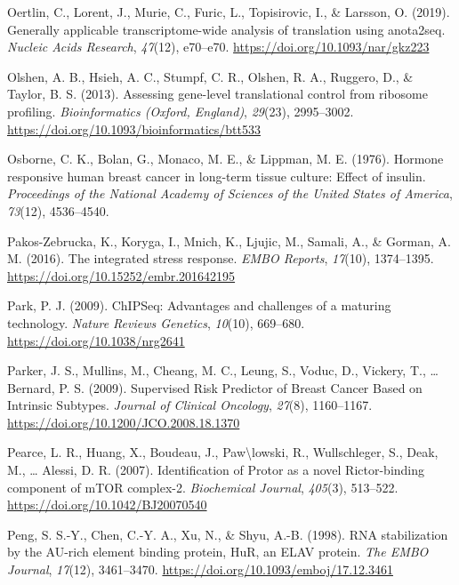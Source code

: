 \documentclass[12pt,openany]{book}
\begin{document}
\hypertarget{ref-Oertlin2019}{}
Oertlin, C., Lorent, J., Murie, C., Furic, L., Topisirovic, I., \&
Larsson, O. (2019). Generally applicable transcriptome-wide analysis of
translation using anota2seq. \emph{Nucleic Acids Research},
\emph{47}(12), e70--e70. \url{https://doi.org/10.1093/nar/gkz223}

\hypertarget{ref-Olshen2013}{}
Olshen, A. B., Hsieh, A. C., Stumpf, C. R., Olshen, R. A., Ruggero, D.,
\& Taylor, B. S. (2013). Assessing gene-level translational control from
ribosome profiling. \emph{Bioinformatics (Oxford, England)},
\emph{29}(23), 2995--3002.
\url{https://doi.org/10.1093/bioinformatics/btt533}

\hypertarget{ref-Osborne1976}{}
Osborne, C. K., Bolan, G., Monaco, M. E., \& Lippman, M. E. (1976).
Hormone responsive human breast cancer in long-term tissue culture:
Effect of insulin. \emph{Proceedings of the National Academy of Sciences
of the United States of America}, \emph{73}(12), 4536--4540.

\hypertarget{ref-Pakos-Zebrucka2016}{}
Pakos-Zebrucka, K., Koryga, I., Mnich, K., Ljujic, M., Samali, A., \&
Gorman, A. M. (2016). The integrated stress response. \emph{EMBO
Reports}, \emph{17}(10), 1374--1395.
\url{https://doi.org/10.15252/embr.201642195}

\hypertarget{ref-Park2009}{}
Park, P. J. (2009). ChIPSeq: Advantages and challenges of a maturing
technology. \emph{Nature Reviews Genetics}, \emph{10}(10), 669--680.
\url{https://doi.org/10.1038/nrg2641}

\hypertarget{ref-Parker2009}{}
Parker, J. S., Mullins, M., Cheang, M. C., Leung, S., Voduc, D.,
Vickery, T., \ldots{} Bernard, P. S. (2009). Supervised Risk Predictor
of Breast Cancer Based on Intrinsic Subtypes. \emph{Journal of Clinical
Oncology}, \emph{27}(8), 1160--1167.
\url{https://doi.org/10.1200/JCO.2008.18.1370}

\hypertarget{ref-Pearce2007}{}
Pearce, L. R., Huang, X., Boudeau, J., Paw\textbackslash{}lowski, R.,
Wullschleger, S., Deak, M., \ldots{} Alessi, D. R. (2007).
Identification of Protor as a novel Rictor-binding component of mTOR
complex-2. \emph{Biochemical Journal}, \emph{405}(3), 513--522.
\url{https://doi.org/10.1042/BJ20070540}

\hypertarget{ref-Peng1998}{}
Peng, S. S.-Y., Chen, C.-Y. A., Xu, N., \& Shyu, A.-B. (1998). RNA
stabilization by the AU-rich element binding protein, HuR, an ELAV
protein. \emph{The EMBO Journal}, \emph{17}(12), 3461--3470.
\url{https://doi.org/10.1093/emboj/17.12.3461}
\end{document}
